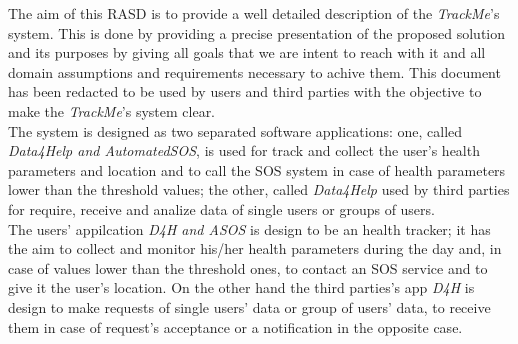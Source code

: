 The aim of this RASD is to provide a well detailed description of the \textit{TrackMe}'s system.
This is done by providing a precise presentation of the proposed solution and its purposes by giving all goals that we are intent to reach with it and all domain assumptions and requirements necessary to achive them.
This document has been redacted to be used by users and third parties with the objective to make the \textit{TrackMe}'s system clear.\vspace{0.5cm}\\The system is designed as two separated software applications: one, called \textit{Data4Help and AutomatedSOS}, is used for track and collect the user's health parameters and location and to call the SOS system in case of health parameters lower than the threshold values; the other, called \textit{Data4Help} used by third parties for require, receive and analize data of single users or groups of users.\\
The users' appilcation \textit{D4H and ASOS} is design to be an health tracker; it has the aim to collect and monitor his/her health parameters during the day and, in case of values lower than the threshold ones, to contact an SOS service and to give it the user's location. On the other hand the third parties's app \textit{D4H} is design to make requests of single users' data or group of users' data, to receive them in case of request's acceptance or a notification in the opposite case.